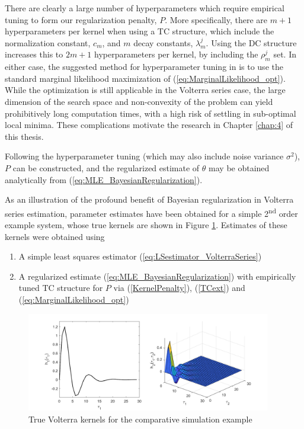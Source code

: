 There are clearly a large number of hyperparameters which require empirical tuning to form our regularization penalty, $P$. More specifically, there are $m+1$ hyperparameters per kernel when using a TC structure, which include the normalization constant, $c_m$, and $m$ decay constants, $\lambda_m^j$. Using the DC structure increases this to $2m+1$ hyperparameters per kernel, by including the $\rho_m^j$ set. In either case, the suggested method for hyperparameter tuning in \cite{Birpoutsoukis2017} is to use the standard marginal likelihood maximization of (\ref{eq:MarginalLikelihood_opt}). While the optimization is still applicable in the Volterra series case, the large dimension of the search space and non-convexity of the problem can yield prohibitively long computation times, with a high risk of settling in sub-optimal local minima. These complications motivate the research in Chapter \ref{chap:4} of this thesis.

Following the hyperparameter tuning (which may also include noise variance $\sigma^2$), $P$ can be constructed, and the regularized estimate of $\theta$ may be obtained analytically from (\ref{eq:MLE_BayesianRegularization}).

As an illustration of the profound benefit of Bayesian regularization in Volterra series estimation, parameter estimates have been obtained for a simple 2\textsuperscript{nd} order example system, whose true kernels are shown in Figure \ref{fig:ExampleLSvsReLS_TrueKernels}. Estimates of these kernels were obtained using 
\begin{enumerate}
\item A simple least squares estimator (\ref{eq:LSestimator_VolterraSeries})
\item A regularized estimate (\ref{eq:MLE_BayesianRegularization}) with empirically tuned TC structure for $P$ via (\ref{KernelPenalty}), (\ref{TCext}) and (\ref{eq:MarginalLikelihood_opt})
\end{enumerate}

\begin{figure}[h]
\centering
\includegraphics[width = 0.95\textwidth]{Chapter3_VolterraSeries/LSvsReLS_truekernels.pdf}
\caption{True Volterra kernels for the comparative simulation example}
\label{fig:ExampleLSvsReLS_TrueKernels}
\end{figure}

